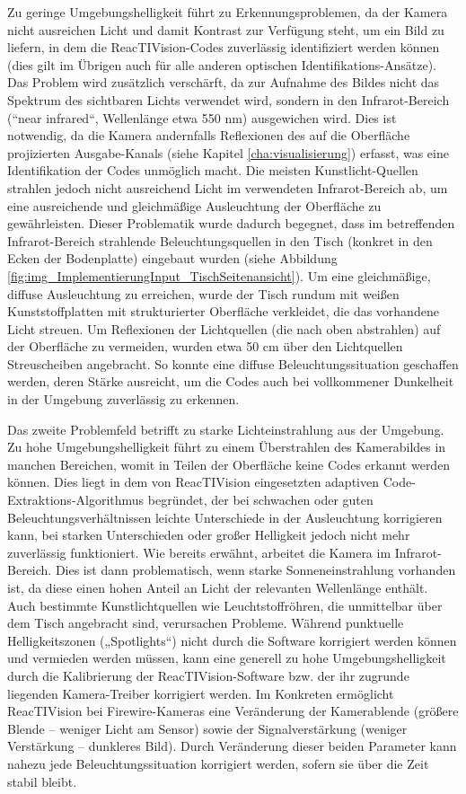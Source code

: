 Zu geringe Umgebungshelligkeit führt zu Erkennungsproblemen, da der Kamera nicht ausreichen Licht und damit Kontrast zur Verfügung steht, um ein Bild zu liefern, in dem die ReacTIVision-Codes zuverlässig identifiziert werden können (dies gilt im Übrigen auch für alle anderen optischen Identifikations-Ansätze). Das Problem wird zusätzlich verschärft, da zur Aufnahme des Bildes nicht das Spektrum des sichtbaren Lichts verwendet wird, sondern in den Infrarot-Bereich (“near infrared“, Wellenlänge etwa 550 nm) ausgewichen wird. Dies ist notwendig, da die Kamera andernfalls Reflexionen des auf die Oberfläche projizierten Ausgabe-Kanals (siehe Kapitel \ref{cha:visualisierung}) erfasst, was eine Identifikation der Codes unmöglich macht. Die meisten Kunstlicht-Quellen strahlen jedoch nicht ausreichend Licht im verwendeten Infrarot-Bereich ab, um eine ausreichende und gleichmäßige Ausleuchtung der Oberfläche zu gewährleisten. Dieser Problematik wurde dadurch begegnet, dass im betreffenden Infrarot-Bereich strahlende Beleuchtungsquellen in den Tisch (konkret in den Ecken der Bodenplatte) eingebaut wurden (siehe Abbildung \ref{fig:img_ImplementierungInput_TischSeitenansicht}). Um eine gleichmäßige, diffuse Ausleuchtung zu erreichen, wurde der Tisch rundum mit weißen Kunststoffplatten mit strukturierter Oberfläche verkleidet, die das vorhandene Licht streuen. Um Reflexionen der Lichtquellen (die nach oben abstrahlen) auf der Oberfläche zu vermeiden, wurden etwa 50 cm über den Lichtquellen Streuscheiben angebracht. So konnte eine diffuse Beleuchtungssituation geschaffen werden, deren Stärke ausreicht, um die Codes auch bei vollkommener Dunkelheit in der Umgebung zuverlässig zu erkennen.

Das zweite Problemfeld betrifft zu starke Lichteinstrahlung aus der Umgebung. Zu hohe Umgebungshelligkeit führt zu einem Überstrahlen des Kamerabildes in manchen Bereichen, womit in Teilen der Oberfläche keine Codes erkannt werden können. Dies liegt in dem von ReacTIVision eingesetzten adaptiven Code-Extraktions-Algorithmus begründet, der bei schwachen oder guten Beleuchtungsverhältnissen leichte Unterschiede in der Ausleuchtung korrigieren kann, bei starken Unterschieden oder großer Helligkeit jedoch nicht mehr zuverlässig funktioniert. Wie bereits erwähnt, arbeitet die Kamera im Infrarot-Bereich. Dies ist dann problematisch, wenn starke Sonneneinstrahlung vorhanden ist, da diese einen hohen Anteil an Licht der relevanten Wellenlänge enthält. Auch bestimmte Kunstlichtquellen wie Leuchtstoffröhren, die unmittelbar über dem Tisch angebracht sind, verursachen Probleme. Während punktuelle Helligkeitszonen („Spotlights“) nicht durch die Software korrigiert werden können und vermieden werden müssen, kann eine generell zu hohe Umgebungshelligkeit durch die Kalibrierung der ReacTIVision-Software bzw. der ihr zugrunde liegenden Kamera-Treiber korrigiert werden. Im Konkreten ermöglicht ReacTIVision bei Firewire-Kameras eine Veränderung der Kamerablende (größere Blende -- weniger Licht am Sensor) sowie der Signalverstärkung (weniger Verstärkung -- dunkleres Bild). Durch Veränderung dieser beiden Parameter kann nahezu jede Beleuchtungssituation korrigiert werden, sofern sie über die Zeit stabil bleibt.

